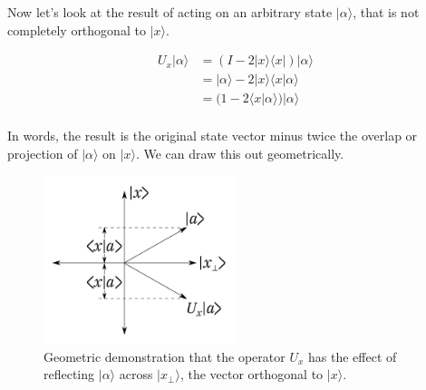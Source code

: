 \documentclass[12pt]{amsart}
\begin{document}
Now let's look at the result of acting on an arbitrary state $|\alpha\rangle$, that is not completely orthogonal to $|x\rangle$.

\begin{equation}
	\begin{split}
		U_x |\alpha\rangle & = (I - 2 |x\rangle\langle x| ) |\alpha\rangle \\
		& = |\alpha\rangle - 2 |x\rangle\langle x | \alpha\rangle \\
		& = (1 - 2 \langle x | \alpha\rangle)  |\alpha\rangle \\
	\end{split}
\end{equation}

In words, the result is the original state vector minus twice the overlap or projection of $|\alpha\rangle$ on $|x\rangle$. We can draw this out geometrically.
\begin{figure}[h]
   \centering
   \includegraphics[width=0.5\textwidth]{./img/fig-00} %
   \caption{Geometric demonstration that the operator $U_x$ has the effect of reflecting $|\alpha\rangle$ across $|x_\perp\rangle$, the vector orthogonal to $|x\rangle$.}
   \label{fig:example}
\end{figure}
\end{document}
